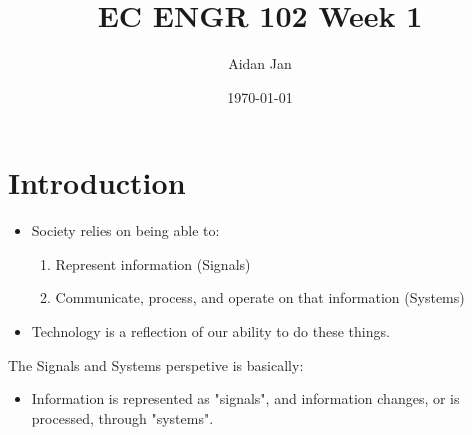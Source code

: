 \documentclass[10pt]{article}
\title{EC ENGR 102 Week 1}
\author{Aidan Jan}
\date{\today}
\begin{document}
\maketitle
\section*{Introduction}
\begin{itemize}
    \item Society relies on being able to:
    \begin{enumerate}
        \item Represent information (Signals)
        \item Communicate, process, and operate on that information (Systems)
    \end{enumerate}
    \item Technology is a reflection of our ability to do these things.
\end{itemize}
The Signals and Systems perspetive is basically:
\begin{itemize}
    \item Information is represented as "signals", and information changes, or is processed, through "systems".
\end{itemize}
\end{document}
